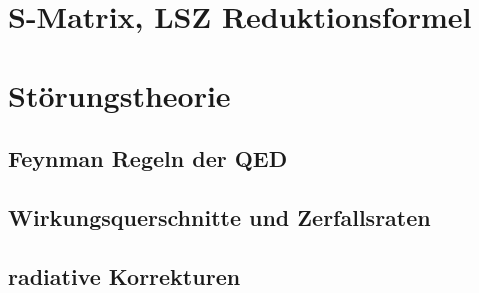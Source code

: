 \documentclass{include/thesisclass}
\begin{document}
\chapter{S-Matrix, LSZ Reduktionsformel}

\chapter{Störungstheorie}	
\section{Feynman Regeln der QED}
\section{Wirkungsquerschnitte und Zerfallsraten}
\section{radiative Korrekturen}
\end{document}

